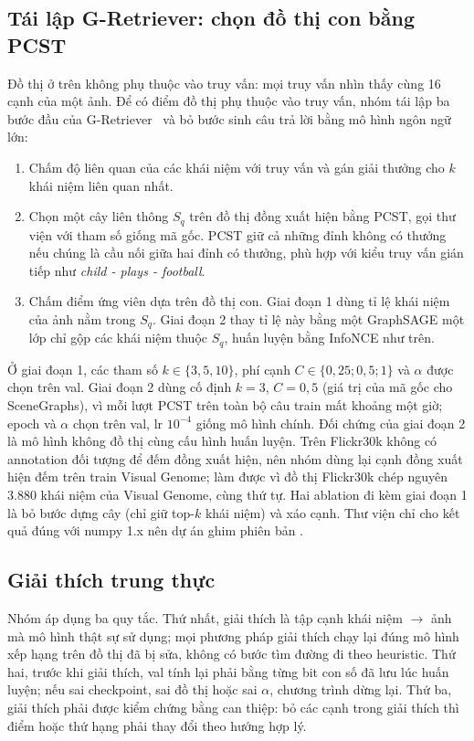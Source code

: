 \subsection{Tái lập G-Retriever: chọn đồ thị con bằng PCST}
\label{sec:gret-method}
Đồ thị ở trên không phụ thuộc vào truy vấn: mọi truy vấn nhìn thấy cùng 16 cạnh của một ảnh. Để có điểm đồ thị phụ thuộc vào truy vấn, nhóm tái lập ba bước đầu của G-Retriever~\cite{he2024gretriever} và bỏ bước sinh câu trả lời bằng mô hình ngôn ngữ lớn:
\begin{enumerate}
\item Chấm độ liên quan của các khái niệm với truy vấn và gán giải thưởng cho $k$ khái niệm liên quan nhất.
\item Chọn một cây liên thông $S_q$ trên đồ thị đồng xuất hiện bằng PCST, gọi thư viện  với tham số giống mã gốc. PCST giữ cả những đỉnh không có thưởng nếu chúng là cầu nối giữa hai đỉnh có thưởng, phù hợp với kiểu truy vấn gián tiếp như \emph{child - plays - football}.
\item Chấm điểm ứng viên dựa trên đồ thị con. Giai đoạn 1 dùng tỉ lệ khái niệm của ảnh nằm trong $S_q$. Giai đoạn 2 thay tỉ lệ này bằng một GraphSAGE một lớp chỉ gộp các khái niệm thuộc $S_q$, huấn luyện bằng InfoNCE như trên.
\end{enumerate}
Ở giai đoạn 1, các tham số $k \in \{3, 5, 10\}$, phí cạnh $C \in \{0,25; 0,5; 1\}$ và $\alpha$ được chọn trên val. Giai đoạn 2 dùng cố định $k = 3$, $C = 0,5$ (giá trị của mã gốc cho SceneGraphs), vì mỗi lượt PCST trên toàn bộ câu train mất khoảng một giờ; epoch và $\alpha$ chọn trên val, lr $10^{-4}$ giống mô hình chính. Đối chứng của giai đoạn 2 là mô hình không đồ thị cùng cấu hình huấn luyện. Trên Flickr30k không có annotation đối tượng để đếm đồng xuất hiện, nên nhóm dùng lại cạnh đồng xuất hiện đếm trên train Visual Genome; làm được vì đồ thị Flickr30k chép nguyên 3.880 khái niệm của Visual Genome, cùng thứ tự. Hai ablation đi kèm giai đoạn 1 là bỏ bước dựng cây (chỉ giữ top-$k$ khái niệm) và xáo cạnh. Thư viện  chỉ cho kết quả đúng với numpy 1.x nên dự án ghim phiên bản .

\subsection{Giải thích trung thực}
\label{sec:xai-method}
Nhóm áp dụng ba quy tắc. Thứ nhất, giải thích là tập cạnh khái niệm $\to$ ảnh mà mô hình thật sự sử dụng; mọi phương pháp giải thích chạy lại đúng mô hình xếp hạng trên đồ thị đã bị sửa, không có bước tìm đường đi theo heuristic. Thứ hai, trước khi giải thích, \mrr{} val tính lại phải bằng từng bit con số đã lưu lúc huấn luyện; nếu sai checkpoint, sai đồ thị hoặc sai $\alpha$, chương trình dừng lại. Thứ ba, giải thích phải được kiểm chứng bằng can thiệp: bỏ các cạnh trong giải thích thì điểm hoặc thứ hạng phải thay đổi theo hướng hợp lý.

